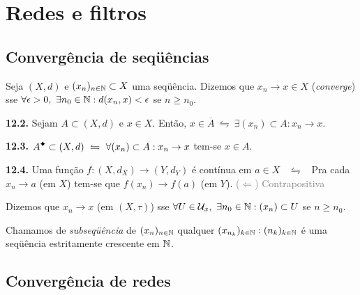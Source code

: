 \section{Redes e filtros}

\subsection*{Convergência de seqüências}

\begin{definition}
    Seja \((X,d)\) e \((x_n)_{n\in \mathbb{N}}\subset X\) uma seqüência. Dizemos que \(x_n \to x \in X\) (\emph{converge}) sse \(\forall \epsilon >0, \ \exists n_0 \in \mathbb{N} : d(x_n, x) <\epsilon \) se \(n\geq n_0\).
\end{definition}

\begin{proposition}
    \textbf{12.2.} Sejam \(A \subset (X, d)\) e \(x\in X\). Então, \(x \in \overline{A} \ \leftrightharpoons \ \exists (x_n) \subset A : x_n \to x\). 
\end{proposition}

\begin{corollary}
    \textbf{12.3.} \(A\ce \subset (X,d) \ \leftrightharpoons \ \forall (x_n)\subset A: x_n \to x\) tem-se \(x\in A\). 
\end{corollary}

\begin{proposition}
    \textbf{12.4.} Uma função \(f : (X, d_X) \to (Y, d_Y)\) é contínua em \(a\in X\) \ \(\leftrightharpoons\) \ Pra cada \(x_n \to a \) (em \(X\)) tem-se que \(f(x_n) \to f(a)\) (em \(Y\)). \textcolor{gray}{(\(\Leftarrow\)) Contrapositiva}
\end{proposition}

\begin{definition}
    Dizemos que \(x_n \to x\) (em \((X, \tau)\)) sse \(\forall U \in \mathcal{U}_x, \ \exists n_0 \in \mathbb{N} : (x_n) \subset U \) se \(n \geq n_0\).
\end{definition}

\begin{definition}
    Chamamos de \emph{subseqüência} de \((x_n)_{n\in \mathbb{N}}\) qualquer \((x_{n_k})_{k\in \mathbb{N}} : (n_k)_{k\in \mathbb{N}}\) é uma seqüência estritamente crescente em \(\mathbb{N}\). 
\end{definition}

\subsection*{Convergência de redes}

